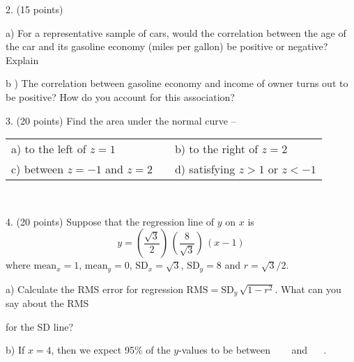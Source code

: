 \documentclass[10pt]{article}
\begin{document}
2. (15 points) 

\hspace{20pt} a) For a representative sample of cars, would the correlation between the
age of the car and its gasoline economy (miles per gallon) be positive or negative?  Explain
\vspace{1.75in}

\hspace{20pt} b ) The correlation between gasoline economy and income of owner turns out to 
be positive?  How do you account for this association?
\vspace{2in}


3. (20 points) Find the area under the normal curve --

\begin{center}
\begin{tabular}{lcl}
a) to the left of $z=1$ &   \hspace{2in} & b) to the right of $z=2$\\[1.8in]
c) between $z=-1$ and $z=2$   & & d) satisfying $z>1$ or $z<-1$
\end{tabular}
\end{center}
\vspace{1.2in}

\vfill
\eject
{\ }

4. (20 points) Suppose that the regression line of $y$ on $x$ 
is \[y=\left(\frac{\sqrt{3}}{2}\right)\,\left(\frac{8}{\sqrt{3}}\right)\,(x-1)\] 
where $\mbox{mean}_x=1$, $\mbox{mean}_y=0$, $\mbox{SD}_x=\sqrt{3}$, $\mbox{SD}_y=8$
and $r=\sqrt{3}/2$.\vspace{3pt}

\hspace{20pt} a) Calculate the RMS error for regression 
$\mbox{RMS}=\mbox{SD}_y\,\sqrt{1-r^2}$.  What can you say about the RMS\vspace{-4pt}

\hspace{20pt}\hphantom{b) } for the SD line?
\vspace{2in}

\hspace{20pt} b) If $x=4$, then we expect 95\% of the $y$-values to be
between \ \underline{\hspace{60pt}} \ \ and \  \underline{\hspace{60pt}} \ .
\vspace{2in}
\end{document}
